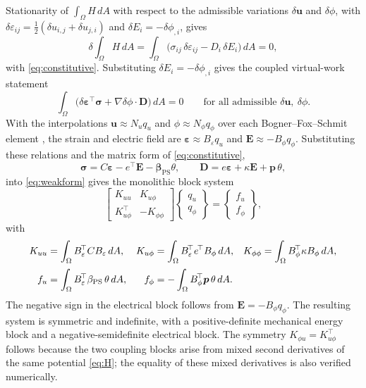\documentclass[a4paper,12pt]{elsarticle}
\begin{document}
Stationarity of $\int_\Omega H\,dA$ with respect to the admissible variations
$\delta\bm u$ and $\delta\phi$, with
$\delta\varepsilon_{ij}=\tfrac12(\delta u_{i,j}+\delta u_{j,i})$ and
$\delta E_i=-\delta\phi_{,i}$, gives
\begin{equation}
\delta\!\int_\Omega H\,dA
=\int_\Omega\big(\sigma_{ij}\,\delta\varepsilon_{ij}
-D_i\,\delta E_i\big)\,dA=0,
\label{eq:stationarity}
\end{equation}
with \eqref{eq:constitutive}. Substituting
$\delta E_i=-\delta\phi_{,i}$ gives the coupled virtual-work statement
\begin{equation}
\int_\Omega\big(\delta\bm\varepsilon^{\!\top}\bm\sigma
+\nabla\delta\phi\cdot\bm D\big)\,dA=0
\qquad\text{for all admissible }\delta\bm u,\ \delta\phi.
\label{eq:weakform}
\end{equation}
With the interpolations $\bm u\approx N_uq_u$ and
$\phi\approx N_\phi q_\phi$ over each Bogner--Fox--Schmit element
, the strain and electric field are
$\bm\varepsilon\approx B_\varepsilon q_u$ and
$\bm E\approx-B_\phi q_\phi$. Substituting these relations and the matrix form of
\eqref{eq:constitutive},
\[
\bm\sigma=C\bm\varepsilon-e^{\!\top}\bm E
-\bm\beta_{\mathrm{PS}}\theta,
\qquad
\bm D=e\bm\varepsilon+\kappa\bm E+\bm p\,\theta,
\]
into \eqref{eq:weakform} gives the monolithic block system
\begin{equation}
\begin{bmatrix}
K_{uu} & K_{u\phi}\\
K_{u\phi}^{\!\top} & -K_{\phi\phi}
\end{bmatrix}
\begin{Bmatrix}q_u\\q_\phi\end{Bmatrix}
=
\begin{Bmatrix}f_u\\f_\phi\end{Bmatrix},
\label{eq:global}
\end{equation}
with
{\small
\begin{align}
K_{uu}&=\int_\Omega B_\varepsilon^{\!\top}CB_\varepsilon\,dA, &
K_{u\phi}&=\int_\Omega B_\varepsilon^{\!\top}e^{\!\top}B_\phi\,dA, &
K_{\phi\phi}&=\int_\Omega B_\phi^{\!\top}\kappa B_\phi\,dA,\notag\\[2pt]
f_u&=\int_\Omega B_\varepsilon^{\!\top}\beta_{\mathrm{PS}}\,\theta\,dA, &
f_\phi&=-\int_\Omega B_\phi^{\!\top}\bm p\,\theta\,dA.& &
\label{eq:elementmats}
\end{align}
}
The negative sign in the electrical block follows from
$\bm E=-B_\phi q_\phi$. The resulting system is symmetric and indefinite, with a
positive-definite mechanical energy block and a negative-semidefinite electrical
block. The symmetry
$K_{\phi u}=K_{u\phi}^{\!\top}$ follows because the two coupling blocks arise from
mixed second derivatives of the same potential \eqref{eq:H}; the equality of these
mixed derivatives is also verified numerically.
\end{document}
